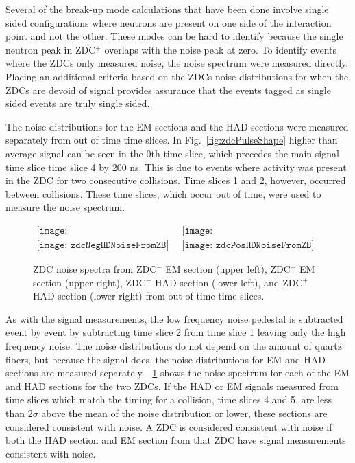       Several of the break-up mode calculations that have been done involve
        single sided configurations where neutrons are present on one side
        of the interaction point and not the other.
      These modes can be hard to identify because the single neutron peak in 
        ZDC$^{+}$ overlaps with the noise peak at zero.
      To identify events where the ZDCs only measured noise, the noise
        spectrum were measured directly.
      Placing an additional criteria based on the ZDCs noise distributions for
        when the ZDCs are devoid of signal provides assurance that the events 
        tagged as single sided events are truly single sided.

      
      The noise distributions for the EM sections and the HAD sections were
        measured separately from out of time time slices.
      In Fig.~\ref{fig:zdcPulseShape} higher than average signal can be seen
        in the 0th time slice, which precedes the main signal time slice 
        time slice 4 by 200 ns. 
      This is due to events where activity was present in the ZDC for 
        two consecutive collisions.
      Time slices 1 and 2, however, occurred between collisions.
      These time slices, which occur out of time, were used to measure the 
        noise spectrum.
      \begin{figure}[!Hhbt]
        \centering
        $ \begin{array}{cc}
          \texttt{[image: zdcNegEMNoiseFromZBNoCor]} & 
          \texttt{[image: zdcPosEMNoiseFromZBNoCor]} \\
          \texttt{[image: zdcNegHDNoiseFromZB]} &
          \texttt{[image: zdcPosHDNoiseFromZB]}
        \end{array} $
        \caption{ZDC noise spectra from ZDC$^{-}$ EM section (upper left), 
          ZDC$^{+}$ EM section (upper right), ZDC$^{-}$ HAD section (lower left), 
          and ZDC$^{+}$ HAD section (lower right) from out of time time slices.}
        \label{fig:zdcNoiseSpectra}
      \end{figure}

      As with the signal measurements, the low frequency noise pedestal is 
        subtracted event by event by subtracting time slice 2 from time slice
        1 leaving only the high frequency noise.
      The noise distributions do not depend on the amount of quartz fibers, but
        because the signal does, the noise distributions for EM and HAD sections
        are measured separately.
      \DIFdelbegin {}\DIFdelend \DIFaddbegin {}\DIFaddend ~\ref{fig:zdcNoiseSpectra} shows the noise spectrum for each of the 
        EM and HAD sections for the two ZDCs.
      If the HAD or EM signals measured from time slices which match the 
        timing for a collision, time slices 4 and 5, are less than 2$\sigma$ 
        above the mean of the noise distribution or lower, these sections are 
        considered consistent with noise.
      A ZDC is considered consistent with noise if both the HAD section and EM 
        section from that ZDC have signal measurements consistent with noise.

